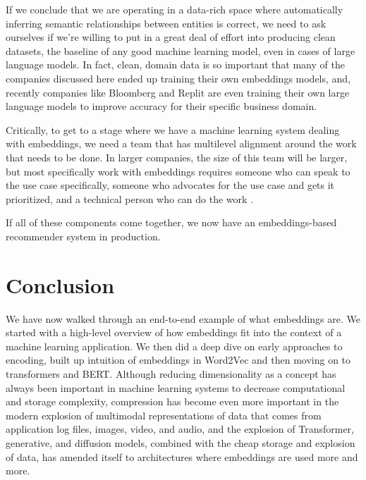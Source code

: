 \documentclass[11pt, table]{diazessay} %
\begin{document}
\begin{sloppypar}
If we conclude that we are operating in a data-rich space where automatically inferring semantic relationships between entities is correct, we need to ask ourselves if we're willing to put in a great deal of effort into producing clean datasets, the baseline of any good machine learning model, even in cases of large language models. In fact, clean, domain data is so important that many of the companies discussed here ended up training their own embeddings models, and, recently companies like Bloomberg \citep{wu2023bloomberggpt} and Replit \citep{Shabani_2023} are even training their own large language models to improve accuracy for their specific business domain.

Critically, to get to a stage where we have a machine learning system dealing with embeddings, we need a team that has multilevel alignment around the work that needs to be done. In larger companies, the size of this team will be larger, but most specifically work with embeddings requires someone who can speak to the use case specifically, someone who advocates for the use case and gets it prioritized, and a technical person who can do the work \citep{meil2023ai}.

If all of these components come together, we now have an embeddings-based recommender system in production.


\section{Conclusion}

We have now walked through an end-to-end example of what embeddings are. We started with a high-level overview of how embeddings fit into the context of a machine learning application. We then did a deep dive on early approaches to encoding, built up intuition of embeddings in Word2Vec and then moving on to transformers and BERT. Although reducing dimensionality as a concept has always been important in machine learning systems to decrease computational and storage complexity, compression has become even more important in the modern explosion of multimodal representations of data that comes from application log files, images, video, and audio, and the explosion of Transformer, generative, and diffusion models, combined with the cheap storage and explosion of data, has amended itself to architectures where embeddings are used more and more.


\end{sloppypar}
\end{document}
